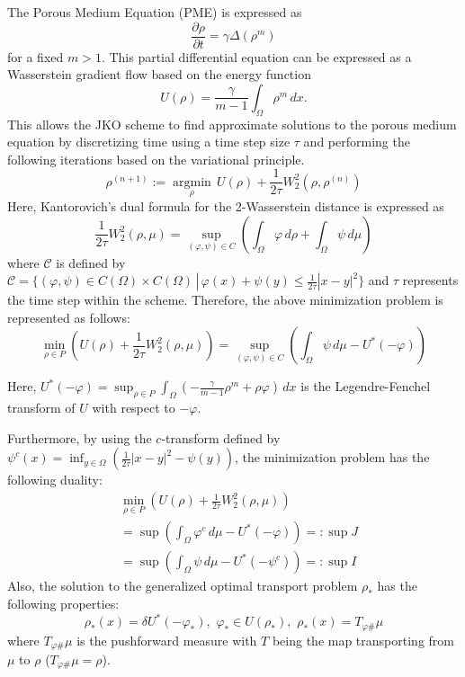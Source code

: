 \documentclass[a4,10.5pt, twocolumn, dvipdfmx]{article}
\theoremstyle{definition}
\begin{document}
The Porous Medium Equation (PME) is expressed as
\[
    \frac{\partial \rho}{\partial t} = \gamma \Delta(\rho^m)
\]
for a fixed \(m > 1\). 
This partial differential equation can be expressed as a Wasserstein gradient flow based on the energy function
\[
    U(\rho) = \frac{\gamma}{m-1} \int_{\Omega} \rho^m \,dx.
\]
This allows the JKO scheme to find approximate solutions to the porous medium equation by discretizing time using a time step size \( \tau \) and performing the following iterations based on the variational principle.
\[
    \rho^{(n+1)} := \underset{\rho}{\operatorname{argmin}}\, U(\rho) + \frac{1}{2\tau} W_2^2(\rho, \rho^{(n)})
\]
Here, Kantorovich's dual formula for the 2-Wasserstein distance is expressed as
\[
    \frac{1}{2\tau} W_2^2(\rho, \mu) = \sup_{(\varphi, \psi) \in C} \left(\int_{\Omega} \varphi \,d\rho + \int_{\Omega} \psi \,d\mu\right)
\]
where \(\mathcal{C}\) is defined by 
\(\mathcal{C} = \{(\varphi, \psi) \in C(\Omega) \times C(\Omega) \,|\, \varphi(x) + \psi(y) \leq \frac{1}{2\tau} |x-y|^2\}\) 
and \(\tau\) represents the time step within the scheme. 
Therefore, the above minimization problem is represented as follows:
\[
    \min_{\rho \in P} \left(U(\rho) + \frac{1}{2\tau} W_2^2(\rho, \mu)\right)= \sup_{(\varphi, \psi) \in C} \left(\int_{\Omega} \psi \,d\mu - U^*(-\varphi)\right)
\]

Here, 
\(U^*(-\varphi) = \sup_{\rho \in P} \int_{\Omega} \left(-\frac{\gamma}{m-1} \rho^m + \rho\varphi\right) \,dx\) 
is the Legendre-Fenchel transform of \(U\) with respect to \(-\varphi\).  

Furthermore, by using the \(c\)-transform defined by 
\(\psi^c(x) = \inf_{y \in \Omega} \left(\frac{1}{2\tau} |x-y|^2 - \psi(y)\right)\), 
the minimization problem has the following duality:
\begin{align*}
    &\min_{\rho \in P} \left(U(\rho) + \frac{1}{2\tau} W_2^2(\rho, \mu)\right) \\
    &= \sup\left(\int_{\Omega} \varphi^c \,d\mu - U^*(-\varphi)\right) =: \sup J\\
    &= \sup\left(\int_{\Omega} \psi \,d\mu - U^*(-\psi^c)\right) =: \sup I
\end{align*}
Also, the solution to the generalized optimal transport problem \(\rho_*\) has the following properties:
\[
    \rho_*(x) = \delta U^*(-\varphi_*), \,\, \varphi_* \in U(\rho_*), \,\, \rho_*(x) = T_{\varphi\#} \mu
\]
where \(T_{\varphi\#} \mu\) is the pushforward measure with \(T\) being the map transporting from \(\mu\) to \(\rho\) ($T_{\varphi\#} \mu = \rho$).
\end{document}
